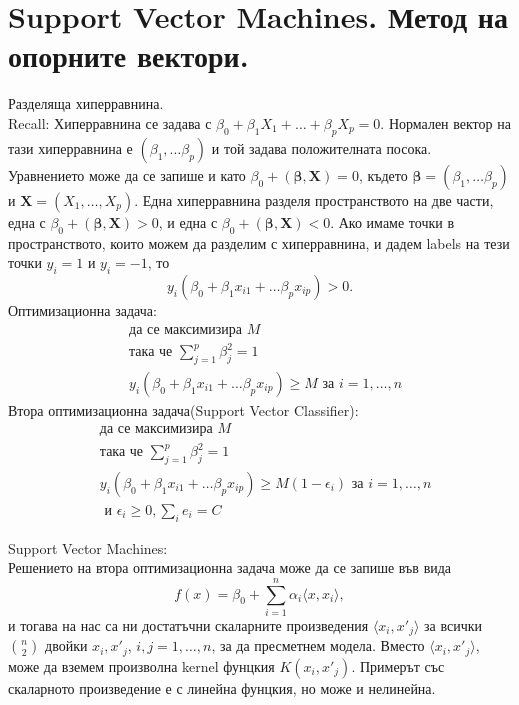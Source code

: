 \section{Support Vector Machines. Метод на опорните вектори.}	
Разделяща хиперравнина. \\
Recall: Хиперравнина се задава с $\beta_0 + \beta_1 X_1 + \dots + \beta_p X_p = 0$. Нормален вектор на тази хиперравнина
е $(\beta_1, \dots \beta_p)$ и той задава положителната посока. Уравнението може да се запише и като $\beta_0 + (\boldsymbol \beta, \mathbf X) = 0 $, където 
$\boldsymbol \beta = (\beta_1, \dots \beta_p) $ и $\mathbf X = (X_1, \dots, X_p)$. Една хиперравнина разделя пространството на две части, една с $\beta_0 + (\boldsymbol \beta, \mathbf X) > 0 $, и една с $\beta_0 + (\boldsymbol \beta, \mathbf X) < 0 $. Ако имаме точки в пространството, които можем да разделим с хиперравнина, и дадем labels на тези точки $y_i = 1$ и $y_i=-1$, то 
$$y_i(\beta_0 + \beta_1 x_{i1} + \dots \beta_p x_{ip}) > 0 .$$
Оптимизационна задача:
\begin{align}
&\text{да се максимизира } M \\ 
&\text{така че } \sum_{j=1}^{p} \beta_j^2 = 1 \\
&	y_i(\beta_0 + \beta_1 x_{i1} + \dots \beta_p x_{ip}) \geq M \text{ за } i=1,\dots,n
\end{align}
Втора оптимизационна задача(Support Vector Classifier):
\begin{align}
&\text{да се максимизира } M \\ 
&\text{така че } \sum_{j=1}^{p} \beta_j^2 = 1 \\
&	y_i(\beta_0 + \beta_1 x_{i1} + \dots \beta_p x_{ip}) \geq M(1-\epsilon_i) \text{ за } i=1,\dots,n \\
& \text{ и } \epsilon_i \geq 0, \sum_i e_i = C 
\end{align}

Support Vector Machines:\\
Решението на втора оптимизационна задача може да се запише във вида
 $$ f(x) = \beta_0 + \sum_{i=1}^n \alpha_i \langle x,x_i \rangle , $$
 и тогава на нас са ни достатъчни скаларните произведения $ \langle x_i,x'_j \rangle $ за всички $ \binom{n}{2} $ двойки $x_i,x'_j $, $i,j = 1, \dots,n $, за да пресметнем модела.	
Вместо 	$ \langle x_i,x'_j \rangle $, може да вземем произволна kernel фунцкия $ K( x_i,x'_j ) $. Примерът със скаларното произведение 
е с линейна фунцкия, но може и нелинейна. \\

